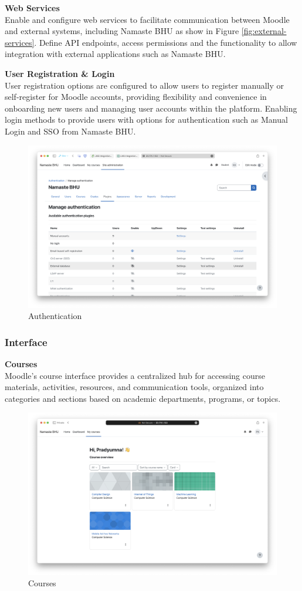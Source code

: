 \textbf{Web Services}\\
Enable and configure web services to facilitate communication between Moodle and external systems, including Namaste BHU as show in Figure \ref{fig:external-services}. Define API endpoints, access permissions and the functionality to allow integration with external applications such as Namaste BHU.

\textbf{User Registration \& Login}\\
User registration options are configured to allow users to register manually or self-register for Moodle accounts, providing flexibility and convenience in onboarding new users and managing user accounts within the platform. Enabling login methods to provide users with options for authentication such as Manual Login and SSO from Namaste BHU.

\begin{figure}[h]
    \centering
    \includegraphics[width=0.75\linewidth]{assets/img/auth.png}
    \caption{Authentication}
    \label{fig:auth}
\end{figure}

\subsubsection*{Interface}

\textbf{Courses}\\
Moodle's course interface provides a centralized hub for accessing course materials, activities, resources, and communication tools, organized into categories and sections based on academic departments, programs, or topics.

\begin{figure}[H]
    \centering
    \includegraphics[width=0.75\linewidth]{assets/img/courses.png}
    \caption{Courses}
    \label{fig:courses}
\end{figure}

